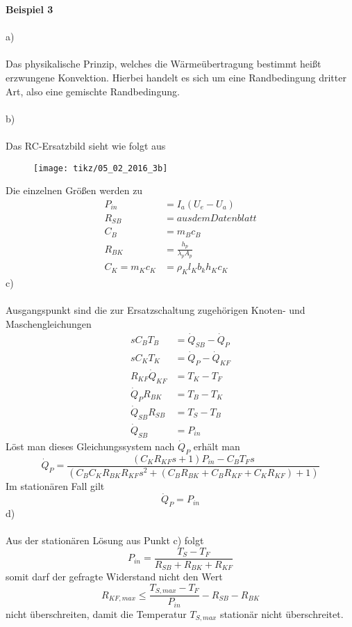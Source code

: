 \textbf{Beispiel 3} \\ \\
a)\\ \\
Das physikalische Prinzip, welches die Wärmeübertragung bestimmt heißt erzwungene Konvektion. Hierbei handelt es sich um eine Randbedingung dritter Art, also eine gemischte Randbedingung. \\ \\ 
b) \\ \\
Das RC-Ersatzbild sieht wie folgt aus
\begin{figure}[h]
	\centering
	\texttt{[image: tikz/05\_02\_2016\_3b]}
\end{figure}
\newline
Die einzelnen Größen werden zu
\begin{align*}
	P_{in} &= I_a(U_e - U_a) \\
	R_{SB} &= aus dem Datenblatt \\
	C_B &= m_Bc_B \\
	R_{BK} &= \frac{h_p}{\lambda_p A_p} \\
	C_K = m_Kc_K &= \rho_K l_K b_k h_K c_K
\end{align*}
\newpage
\noindent
c) \\ \\ 
Ausgangspunkt sind die zur Ersatzschaltung zugehörigen Knoten- und Maschengleichungen
\begin{align*}
	sC_BT_B &= \dot{Q}_{SB} - \dot{Q}_P \\
	sC_KT_K &= \dot{Q}_P - \dot{Q}_{KF} \\
	R_{KF}\dot{Q}_{KF} &= T_K - T_F \\
	\dot{Q}_PR_{BK} &= T_B - T_K \\
	\dot{Q}_{SB}R_{SB} &= T_S - T_B \\
	\dot{Q}_{SB} &= P_{in}
\end{align*}
Löst man dieses Gleichungssystem nach $\dot{Q}_P$ erhält man
\[
	\dot{Q}_P = \frac{(C_KR_{KF}s + 1)P_{in} - C_BT_Fs}{(C_BC_KR_{BK}R_{KF}s^2 + (C_BR_{BK} + C_BR_{KF} + C_KR_{KF}) + 1)}
\]
Im stationären Fall gilt
\[
	\dot{Q}_P = P_{in}
\]
d) \\ \\
Aus der stationären Lösung aus Punkt c) folgt
\[
	P_{in} = \frac{T_S - T_F}{R_{SB} + R_{BK} + R_{KF}}
\]
somit darf der gefragte Widerstand nicht den Wert
\[
	R_{KF,max} \leq \frac{T_{S,max} - T_F}{P_{in}} - R_{SB} -R_{BK}
\]
nicht überschreiten, damit die Temperatur $T_{S,max}$ stationär nicht überschreitet.